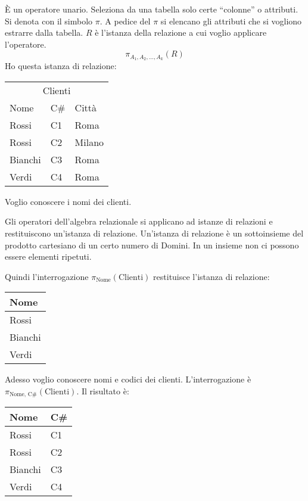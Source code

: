 \`E un operatore unario. Seleziona da una tabella solo certe ``colonne'' o attributi. Si denota con il simbolo $\pi$. A pedice del $\pi$ si elencano gli attributi che si vogliono estrarre dalla tabella. $R$ \`e l'istanza della relazione a cui voglio applicare l'operatore.
\[
\pi_{A_1, A_2, \dots, A_k} (R)
\]
Ho questa istanza di relazione:

\begin{center}
\begin{tabular}{lll}
\multicolumn{3}{c}{Clienti} \\
Nome & C\# & Citt\`a \\
\hline
Rossi & C1 & Roma \\
Rossi & C2 & Milano \\
Bianchi & C3 & Roma \\
Verdi & C4 & Roma
\end{tabular}
\end{center}

Voglio conoscere i nomi dei clienti.

Gli operatori dell'algebra relazionale si applicano ad istanze di relazioni e restituiscono un'istanza di relazione. Un'istanza di relazione \`e un sottoinsieme del prodotto cartesiano di un certo numero di Domini. In un insieme non ci possono essere elementi ripetuti.

Quindi l'interrogazione $\pi_{\text{Nome}}(\text{Clienti})$ restituisce l'istanza di relazione:

\begin{center}
\begin{tabular}{l}
Nome \\
\hline
Rossi \\
Bianchi \\
Verdi
\end{tabular}
\end{center}

Adesso voglio conoscere nomi e codici dei clienti. L'interrogazione \`e $\pi_{\text{Nome, C\#}}({\text{Clienti}})$. Il risultato \`e:

\begin{center}
\begin{tabular}{ll}
Nome & C\# \\
\hline
Rossi & C1 \\
Rossi & C2 \\
Bianchi & C3 \\
Verdi & C4
\end{tabular}
\end{center}

